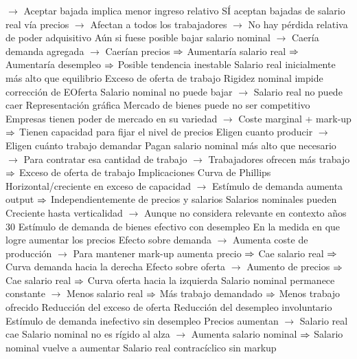 \documentclass{nuevotema}
\begin{document}
\begin{esquemal}
				\4[] $\to$ Aceptar bajada implica menor ingreso relativo
				\4[] SÍ aceptan bajadas de salario real vía precios
				\4[] $\to$ Afectan a todos los trabajadores
				\4[] $\to$ No hay pérdida relativa de poder adquisitivo
				\4[] Aún si fuese posible bajar salario nominal
				\4[] $\to$ Caería demanda agregada
				\4[] $\to$ Caerían precios
				\4[] $\then$ Aumentaría salario real
				\4[] $\then$ Aumentaría desempleo
				\4[] $\then$ Posible tendencia inestable
				\4 Salario real inicialmente más alto que equilibrio
				\4[] Exceso de oferta de trabajo
				\4 Rigidez nominal impide corrección de EOferta
				\4[] Salario nominal no puede bajar
				\4[] $\to$ Salario real no puede caer
				\4 Representación gráfica
				\4[] 
				\4 Mercado de bienes puede no ser competitivo
				\4[] Empresas tienen poder de mercado en su variedad
				\4[] $\to$ Coste marginal + mark-up
				\4[] $\then$ Tienen capacidad para fijar el nivel de precios
				\4[] Eligen cuanto producir
				\4[] $\to$ Eligen cuánto trabajo demandar
				\4[] Pagan salario nominal más alto que necesario
				\4[] $\to$ Para contratar esa cantidad de trabajo
				\4[] $\to$ Trabajadores ofrecen más trabajo
				\4[] $\then$ Exceso de oferta de trabajo
			\3 Implicaciones
				\4 Curva de Phillips
				\4[] Horizontal/creciente en exceso de capacidad
				\4[] $\to$ Estímulo de demanda aumenta output
				\4[] $\then$ Independientemente de precios y salarios
				\4[] Salarios nominales pueden
				\4[] Creciente hasta verticalidad
				\4[] $\to$ Aunque no considera relevante en contexto años 30
				\4 Estímulo de demanda de bienes efectivo con desempleo
				\4[] En la medida en que logre aumentar los precios
				\4[] Efecto sobre demanda
				\4[] $\to$ Aumenta coste de producción
				\4[] $\to$ Para mantener mark-up aumenta precio
				\4[] $\then$ Cae salario real
				\4[] $\then$ Curva demanda hacia la derecha
				\4[] Efecto sobre oferta
				\4[] $\to$ Aumento de precios
				\4[] $\then$ Cae salario real
				\4[] $\then$ Curva oferta hacia la izquierda
				\4[] Salario nominal permanece constante
				\4[] $\to$ Menos salario real
				\4[] $\then$ Más trabajo demandado
				\4[] $\then$ Menos trabajo ofrecido
				\4[$\then$] Reducción del exceso de oferta
				\4[$\then$] Reducción del desempleo involuntario
				\4 Estímulo de demanda inefectivo sin desempleo
				\4[] Precios aumentan
				\4[] $\to$ Salario real cae
				\4[] Salario nominal no es rígido al alza
				\4[] $\to$ Aumenta salario nominal
				\4[] $\then$ Salario nominal vuelve a aumentar
				\4 Salario real contracíclico sin markup

\end{esquemal}
\end{document}
